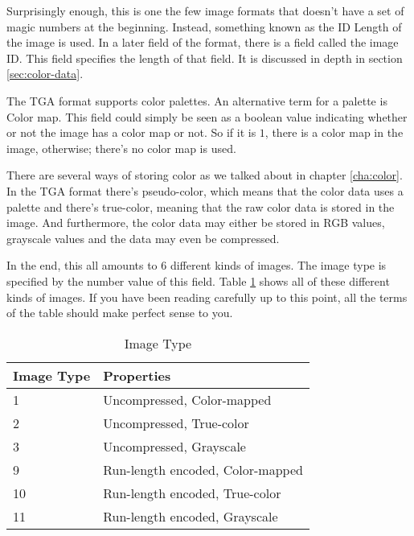 \begin{refsection}

  Surprisingly enough, this is one the few image formats that doesn't
  have a set of magic numbers at the beginning. Instead, something
  known as the ID Length of the image is used. In a later field of the
  format, there is a field called the image ID. This field specifies
  the length of that field. It is discussed in depth in section
  \ref{sec:color-data}.


  The TGA format supports color palettes. An alternative term for a
  palette is Color map. This field could simply be
  seen as a boolean value indicating whether or not the image has a color
  map or not. So if it is $1$, there is a color map in the
  image, otherwise; there's no color map is used.


  There are several ways of storing color as we talked about in
  chapter \ref{cha:color}. In the TGA format there's
  pseudo-color, which means that the color data
  uses a palette and there's true-color, meaning that the raw
  color data is stored in the image. And furthermore, the color data
  may either be stored in RGB values, grayscale values and the data
  may even be compressed.

  In the end, this all amounts to $6$ different kinds of images. The
  image type is specified by the number value of this field. Table \ref{tab:imgtype}
  shows all of these different kinds of images. If you have been
  reading carefully up to this point, all the terms of the table
  should make perfect sense to you.

  \begin{table}
    \centering
    \begin{tabular}{ll}
      \toprule
      Image Type & Properties \\
      \midrule
      1 & Uncompressed, Color-mapped \\
      2 & Uncompressed, True-color \\
      3 & Uncompressed, Grayscale\\
      9 & Run-length encoded, Color-mapped \\
      10 & Run-length encoded, True-color \\
      11 & Run-length encoded, Grayscale\\
      \bottomrule
    \end{tabular}
    \caption{Image Type}
    \label{tab:imgtype}
  \end{table}


\end{refsection}
